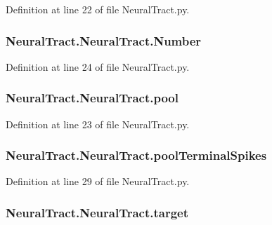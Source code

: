 Definition at line 22 of file Neural\-Tract.\-py.

\hypertarget{class_neural_tract_1_1_neural_tract_a9cf4c6df3fb8818e955817bb3ea9ffc4}{
\subsubsection[{Number}]{\setlength{\rightskip}{0pt plus 5cm}Neural\-Tract.\-Neural\-Tract.\-Number}}\label{class_neural_tract_1_1_neural_tract_a9cf4c6df3fb8818e955817bb3ea9ffc4}


Definition at line 24 of file Neural\-Tract.\-py.

\hypertarget{class_neural_tract_1_1_neural_tract_af0d232b9b86f3bae802b32777d0405d0}{
\subsubsection[{pool}]{\setlength{\rightskip}{0pt plus 5cm}Neural\-Tract.\-Neural\-Tract.\-pool}}\label{class_neural_tract_1_1_neural_tract_af0d232b9b86f3bae802b32777d0405d0}


Definition at line 23 of file Neural\-Tract.\-py.

\hypertarget{class_neural_tract_1_1_neural_tract_a1d104906ff30028e44e377a9e1ed5a3d}{
\subsubsection[{pool\-Terminal\-Spikes}]{\setlength{\rightskip}{0pt plus 5cm}Neural\-Tract.\-Neural\-Tract.\-pool\-Terminal\-Spikes}}\label{class_neural_tract_1_1_neural_tract_a1d104906ff30028e44e377a9e1ed5a3d}


Definition at line 29 of file Neural\-Tract.\-py.

\hypertarget{class_neural_tract_1_1_neural_tract_a637995fcac5bdd80ab1a9d4ea3de7f40}{
\subsubsection[{target}]{\setlength{\rightskip}{0pt plus 5cm}Neural\-Tract.\-Neural\-Tract.\-target}}\label{class_neural_tract_1_1_neural_tract_a637995fcac5bdd80ab1a9d4ea3de7f40}


